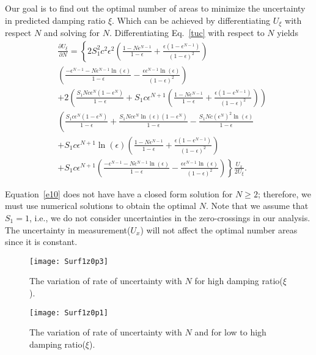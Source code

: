Our goal is to find out the optimal number of areas to minimize the uncertainty in predicted damping ratio $\xi$. Which can be achieved by differentiating $U_\xi$ with respect $N$ and solving for $N$.
Differentiating Eq.~\eqref{tuc} with respect to $N$ yields
\begin{equation}
\label{e10}
\begin{aligned}
&\frac{\partial U_{\xi}}{\partial N}=\left\{2 S_1^{2} c^{2} \epsilon^{2}\left(\frac{1-N \epsilon^{N-1}}{1-\epsilon}+\frac{\epsilon\left(1-\epsilon^{N-1}\right)}{(1-\epsilon)^{2}}\right)\right. \\
&\left(\frac{-\epsilon^{N-1}-N \epsilon^{N-1} \ln (\epsilon)}{1-\epsilon}-\frac{\epsilon \epsilon^{N-1} \ln (\epsilon)}{(1-\epsilon)^{2}}\right)\\
&+2\left(\frac{S_1 N c \epsilon^{N}\left(1-\epsilon^{N}\right)}{1-\epsilon}+S_1 c \epsilon^{N+1}\left(\frac{1-N \epsilon^{N-1}}{1-\epsilon}+\frac{\epsilon\left(1-\epsilon^{N-1}\right)}{(1-\epsilon)^{2}}\right)\right) \\
&\left(\frac{S_1 c \epsilon^{N}\left(1-\epsilon^{N}\right)}{1-\epsilon}+\frac{S_1 N c \epsilon^{N} \ln (\epsilon)\left(1-\epsilon^{N}\right)}{1-\epsilon}-\frac{S_1 N c\left(\epsilon^{N}\right)^{2} \ln (\epsilon)}{1-\epsilon}\right. \\
&\left.+S_1 c \epsilon^{N+1} \ln (\epsilon)\left(\frac{1-N \epsilon^{N-1}}{1-\epsilon}+\frac{\epsilon\left(1-\epsilon^{N-1}\right)}{(1-\epsilon)^{2}}\right)\right. \\
&\left.+S_1 c \epsilon^{N+1}\left(\frac{-\epsilon^{N-1}-N \epsilon^{N-1} \ln (\epsilon)}{1-\epsilon}-\frac{\epsilon \epsilon^{N-1} \ln (\epsilon)}{(1-\epsilon)^{2}}\right)\right\}\frac{ U_{x}}{2U_{\xi}}.
\end{aligned}
\end{equation}

Equation~\eqref{e10} does not have have a closed form solution for $N \geq 2$; therefore, we must use numerical solutions to obtain the optimal $N$. 
Note that we assume that $S_1=1$, i.e., we do not consider uncertainties in the zero-crossings in our analysis. The uncertainty in measurement($U_x$) will not affect the optimal number areas since it is constant.
\begin{figure}[h]
\texttt{[image: Surf1z0p3]}
\centering
\caption{The variation of rate of uncertainty with $N$ for high damping ratio($\xi$).}
\label{uH}
\end{figure}
\begin{figure}[h]
\texttt{[image: Surf1z0p1]}
\centering
\caption{The variation of rate of uncertainty with $N$ and for low to high damping ratio($\xi$).}
\label{uL}
\end{figure}

